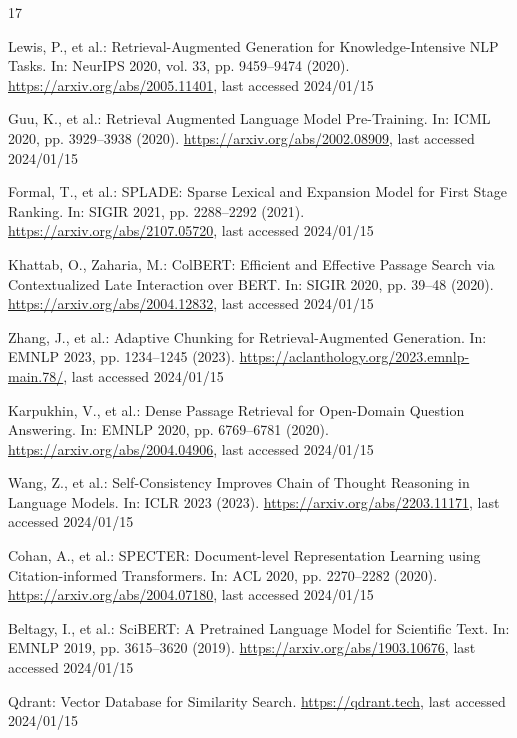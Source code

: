 \documentclass[runningheads]{llncs}
\begin{document}
\begin{thebibliography}{17}

Lewis, P., et al.: Retrieval-Augmented Generation for Knowledge-Intensive NLP Tasks. In: NeurIPS 2020, vol. 33, pp. 9459--9474 (2020). \url{https://arxiv.org/abs/2005.11401}, last accessed 2024/01/15

Guu, K., et al.: Retrieval Augmented Language Model Pre-Training. In: ICML 2020, pp. 3929--3938 (2020). \url{https://arxiv.org/abs/2002.08909}, last accessed 2024/01/15

Formal, T., et al.: SPLADE: Sparse Lexical and Expansion Model for First Stage Ranking. In: SIGIR 2021, pp. 2288--2292 (2021). \url{https://arxiv.org/abs/2107.05720}, last accessed 2024/01/15

Khattab, O., Zaharia, M.: ColBERT: Efficient and Effective Passage Search via Contextualized Late Interaction over BERT. In: SIGIR 2020, pp. 39--48 (2020). \url{https://arxiv.org/abs/2004.12832}, last accessed 2024/01/15

Zhang, J., et al.: Adaptive Chunking for Retrieval-Augmented Generation. In: EMNLP 2023, pp. 1234--1245 (2023). \url{https://aclanthology.org/2023.emnlp-main.78/}, last accessed 2024/01/15

Karpukhin, V., et al.: Dense Passage Retrieval for Open-Domain Question Answering. In: EMNLP 2020, pp. 6769--6781 (2020). \url{https://arxiv.org/abs/2004.04906}, last accessed 2024/01/15

Wang, Z., et al.: Self-Consistency Improves Chain of Thought Reasoning in Language Models. In: ICLR 2023 (2023). \url{https://arxiv.org/abs/2203.11171}, last accessed 2024/01/15

Cohan, A., et al.: SPECTER: Document-level Representation Learning using Citation-informed Transformers. In: ACL 2020, pp. 2270--2282 (2020). \url{https://arxiv.org/abs/2004.07180}, last accessed 2024/01/15

Beltagy, I., et al.: SciBERT: A Pretrained Language Model for Scientific Text. In: EMNLP 2019, pp. 3615--3620 (2019). \url{https://arxiv.org/abs/1903.10676}, last accessed 2024/01/15

Qdrant: Vector Database for Similarity Search. \url{https://qdrant.tech}, last accessed 2024/01/15


\end{thebibliography}
\end{document}

